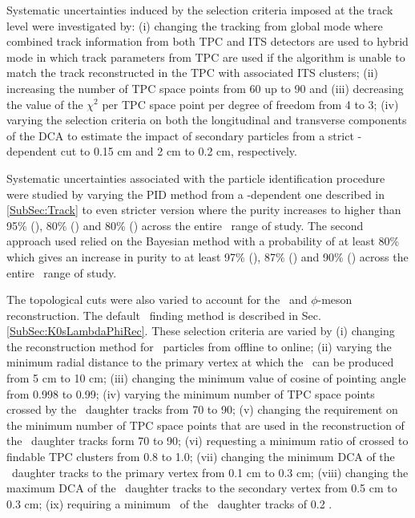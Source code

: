 Systematic uncertainties induced by the selection criteria imposed at the track level were investigated by: (i) changing the tracking from global mode where combined track information from both TPC and ITS detectors are used to hybrid mode in which track parameters from TPC are used if the algorithm is unable to match the track reconstructed in the TPC with associated ITS clusters; (ii) increasing the number of TPC space points from 60 up to 90 and (iii) decreasing the value of the $\chi^{2}$ per TPC space point per degree of freedom from 4 to 3; (iv) varying the selection criteria on both the longitudinal and transverse components of the DCA to estimate the impact of secondary particles from a strict \pT-dependent cut to 0.15 cm and 2 cm to 0.2 cm, respectively.



Systematic uncertainties associated with the particle identification procedure were studied by varying the PID method from a \pT-dependent one described in \ref{SubSec:Track} to even stricter version where the purity increases to higher than 95\% (\pion), 80\% (\kaon) and 80\% (\proton) across the entire \pT~range of study. The second approach used relied on the Bayesian method with a probability of at least 80\% which gives an increase in purity to at least 97\% (\pion), 87\% (\kaon) and 90\% (\proton) across the entire \pT~range of study. 

The topological cuts were also varied to account for the \vo~and $\phi$-meson reconstruction. The default \vo~finding method is described in Sec. \ref{SubSec:K0sLambdaPhiRec}. These selection criteria are varied by (i) changing the reconstruction method for \vo~particles from offline to online; (ii) varying the minimum radial distance to the primary vertex at which the \vo~can be produced from 5 cm to 10 cm; (iii) changing the minimum value of cosine of pointing angle from 0.998 to 0.99; (iv) varying the minimum number of TPC space points crossed by the \vo~daughter tracks from 70 to 90; (v) changing the requirement on the minimum number of TPC space points that are used in the reconstruction of the \vo~daughter tracks form 70 to 90; (vi) requesting a minimum ratio of crossed to findable TPC clusters from 0.8 to 1.0; (vii) changing the minimum DCA of the \vo~daughter tracks to the primary vertex from 0.1 cm to 0.3 cm; (viii) changing the maximum DCA of the \vo~daughter tracks to the secondary vertex from 0.5 cm to 0.3 cm; (ix) requiring a minimum \pT~of the \vo~daughter tracks of 0.2 \GeV. 

